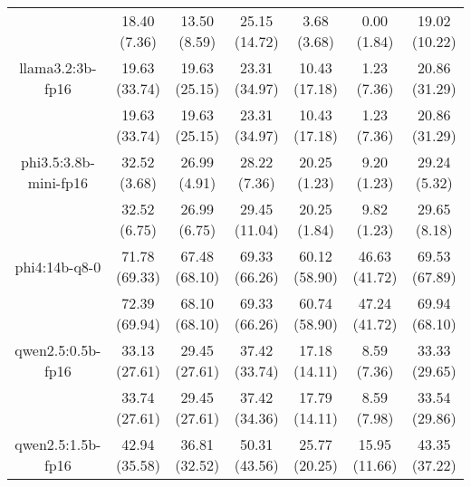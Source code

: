 \begin{table}[]
{\begin{tabular}{ccccccc}
      \multicolumn{1}{c|}{} & 18.40 (7.36) & 13.50 (8.59) & \multicolumn{1}{c|}{25.15 (14.72)} & 3.68 (3.68) & \multicolumn{1}{c|}{0.00 (1.84)} & 19.02 (10.22) \\
      \cline{1-7}


      \multicolumn{1}{c|}{llama3.2:3b-fp16} & 19.63 (33.74) & 19.63 (25.15) & \multicolumn{1}{c|}{23.31 (34.97)} & 10.43 (17.18) & \multicolumn{1}{c|}{1.23 (7.36)} & 20.86 (31.29) \\



      \multicolumn{1}{c|}{} & 19.63 (33.74) & 19.63 (25.15) & \multicolumn{1}{c|}{23.31 (34.97)} & 10.43 (17.18) & \multicolumn{1}{c|}{1.23 (7.36)} & 20.86 (31.29) \\
      \cline{1-7}


      \multicolumn{1}{c|}{phi3.5:3.8b-mini-fp16} & 32.52 (3.68) & 26.99 (4.91) & \multicolumn{1}{c|}{28.22 (7.36)} & 20.25 (1.23) & \multicolumn{1}{c|}{9.20 (1.23)} & 29.24 (5.32) \\



      \multicolumn{1}{c|}{} & 32.52 (6.75) & 26.99 (6.75) & \multicolumn{1}{c|}{29.45 (11.04)} & 20.25 (1.84) & \multicolumn{1}{c|}{9.82 (1.23)} & 29.65 (8.18) \\
      \cline{1-7}


      \multicolumn{1}{c|}{phi4:14b-q8-0} & 71.78 (69.33) & 67.48 (68.10) & \multicolumn{1}{c|}{69.33 (66.26)} & 60.12 (58.90) & \multicolumn{1}{c|}{46.63 (41.72)} & 69.53 (67.89) \\



      \multicolumn{1}{c|}{} & 72.39 (69.94) & 68.10 (68.10) & \multicolumn{1}{c|}{69.33 (66.26)} & 60.74 (58.90) & \multicolumn{1}{c|}{47.24 (41.72)} & 69.94 (68.10) \\
      \cline{1-7}


      \multicolumn{1}{c|}{qwen2.5:0.5b-fp16} & 33.13 (27.61) & 29.45 (27.61) & \multicolumn{1}{c|}{37.42 (33.74)} & 17.18 (14.11) & \multicolumn{1}{c|}{8.59 (7.36)} & 33.33 (29.65) \\



      \multicolumn{1}{c|}{} & 33.74 (27.61) & 29.45 (27.61) & \multicolumn{1}{c|}{37.42 (34.36)} & 17.79 (14.11) & \multicolumn{1}{c|}{8.59 (7.98)} & 33.54 (29.86) \\
      \cline{1-7}


      \multicolumn{1}{c|}{qwen2.5:1.5b-fp16} & 42.94 (35.58) & 36.81 (32.52) & \multicolumn{1}{c|}{50.31 (43.56)} & 25.77 (20.25) & \multicolumn{1}{c|}{15.95 (11.66)} & 43.35 (37.22) \\




\end{tabular}}
\end{table}
